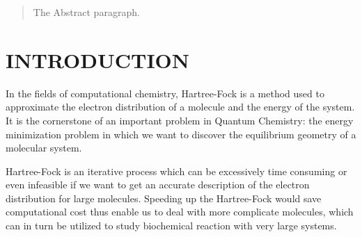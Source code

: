 \documentclass[twoside]{article}
\begin{document}
%

%


\begin{abstract}
  The Abstract paragraph.
\end{abstract}

\section{INTRODUCTION}
In the fields of computational chemistry, Hartree-Fock is a method used to approximate the electron distribution of a molecule and the energy of the system. It is the cornerstone of an important problem in Quantum Chemistry: the energy minimization problem in which we want to discover the equilibrium geometry of a molecular system. 


Hartree-Fock is an iterative process which can be excessively time consuming or even infeasible if we want to get an accurate description of the electron distribution for large molecules. Speeding up the Hartree-Fock would save computational cost thus enable us to deal with more complicate molecules, which can in turn be utilized to study biochemical reaction with very large systems. 
\end{document}
